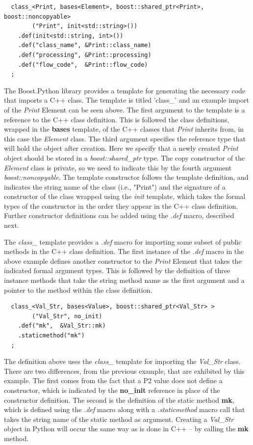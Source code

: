 \documentclass[12pt]{article}
\begin{document}
\begin{verbatim}
  class_<Print, bases<Element>, boost::shared_ptr<Print>, boost::noncopyable>
        ("Print", init<std::string>())
    .def(init<std::string, int>())
    .def("class_name", &Print::class_name)
    .def("processing", &Print::processing)
    .def("flow_code",  &Print::flow_code)
  ;
\end{verbatim}

The Boost.Python library provides a template for generating the necessary code
that imports a C++ class. The template is titled 'class\_' and an example import
of the \emph{Print} Element can be seen above. The first argument to the template
is a reference to the C++ class definition. This is followed the class definitions, wrapped
in the {\bf bases} template, of the C++ classes that \emph{Print} inherits from, in this 
case the \emph{Element} class. The third argument specifies the reference type that
will hold the object after creation. Here we specify that a newly created \emph{Print}
object should be stored in a \emph{boost::shared\_ptr} type. The copy constructor
of the \emph{Element} class is private, so we need to indicate this by the fourth 
argument \emph{boost::noncopyable}. The template constructor follows the template
definition, and indicates the string name of the class (i.e., "Print") and the signature of
a constructor of the class wrapped using the \emph{init} template, which takes the
formal types of the constructor in the order they appear in the C++ class definition. 
Further constructor definitions can be added using the \emph{.def} macro, described
next. 

The \emph{class\_} template provides a \emph{.def} macro for importing some subset
of public methods in the C++ class definition. The first instance of the \emph{.def} 
macro in the above example defines another constructor to the \emph{Print} Element
that takes the indicated formal argument types. This is followed by the definition of
three instance methods that take the string method name as the first argument and
a pointer to the method within the class definition. 

\begin{verbatim}
  class_<Val_Str, bases<Value>, boost::shared_ptr<Val_Str> >
        ("Val_Str", no_init)
    .def("mk",  &Val_Str::mk)
    .staticmethod("mk")
  ;
\end{verbatim}

The definition above uses the \emph{class\_} template for importing the \emph{Val\_Str}
class. There are two differences, from the previous example, that are exhibited by this
example. The first comes from the fact that a P2 value does not define a constructor,
which is indicated by the {\bf no\_init} reference in place of the constructor definition.
The second is the definition of the static method {\bf mk}, which is defined using the
\emph{.def} macro along with a \emph{.staticmethod} macro call that takes the
string name of the static method as argument. Creating a \emph{Val\_Str} object
in Python will occur the same way as is done in C++ -- by calling the {\bf mk} method.
\end{document}
